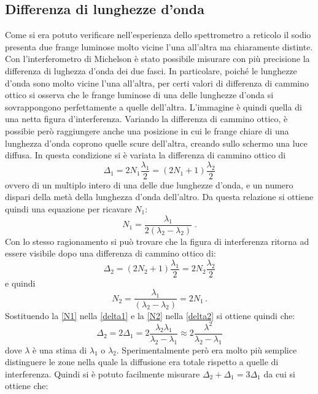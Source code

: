 \documentclass[a4paper,11pt]{article}
\begin{document}
	\subsection{Differenza di lunghezze d'onda}
	Come si era potuto verificare nell'esperienza dello spettrometro a reticolo il sodio presenta due frange luminose molto vicine l'una all'altra ma chiaramente distinte. Con l'interferometro di Michelson è stato possibile misurare con più precisione la differenza di lughezza d'onda dei due fasci. In particolare, poiché le lunghezze d'onda sono molto vicine l'una all'altra, per certi valori di differenza di cammino ottico si osserva che le frange luminose di una delle lunghezze d'onda si sovrappongono perfettamente a quelle dell'altra. L'immagine è quindi quella di una netta figura d'interferenza. Variando la differenza di cammino ottico, è possibie però raggiungere anche una posizione in cui le frange chiare di una lunghezza d'onda coprono quelle scure dell'altra, creando sullo schermo una luce diffusa. In questa condizione si è variata la differenza di cammino ottico di
	\begin{equation}\label{delta1}
		\Delta_1=2N_1\frac{\lambda_1}{2}=(2N_1+1)\frac{\lambda_2}{2}
	\end{equation}
	ovvero di un multiplo intero di una delle due lunghezze d'onda, e un numero dispari della metà della lunghezza d'onda dell'altro. Da questa relazione si ottiene quindi una equazione per ricavare $ N_1 $:
	\begin{equation}\label{N1}
		N_1=\dfrac{\lambda_1}{2\left(\lambda_2-\lambda_2\right)}\;.
	\end{equation}
	Con lo stesso ragionamento si può trovare che la figura di interferenza ritorna ad essere visibile dopo una differenza di cammino ottico di:
	\begin{equation}\label{delta2}
		\Delta_2=(2N_2+1)\frac{\lambda_1}{2}=2N_2\frac{\lambda_2}{2}
	\end{equation}
	e quindi 
	\begin{equation}\label{N2}
		N_2=\dfrac{\lambda_1}{\left(\lambda_2-\lambda_2\right)}=2N_1 \, .
	\end{equation}
	Sostituendo la \ref{N1} nella \ref{delta1} e la \ref{N2} nella \ref{delta2} si ottiene quindi che:
	\begin{equation}\label{deltas}
		\Delta_2=2\Delta_1=2\dfrac{\lambda_2\lambda_1}{\lambda_2-\lambda_1}\approx2\dfrac{\lambda^2}{\lambda_2-\lambda_1}
	\end{equation}
	dove $ \lambda $ è una stima di $ \lambda_1 $ o $ \lambda_2 $. Sperimentalmente però era molto più semplice distinguere le zone nella quale la diffusione era totale rispetto a quelle di interferenza. Quindi si è potuto facilmente misurare $ \Delta_2+\Delta_1=3\Delta_1 $ da cui si ottiene che:
\end{document}
